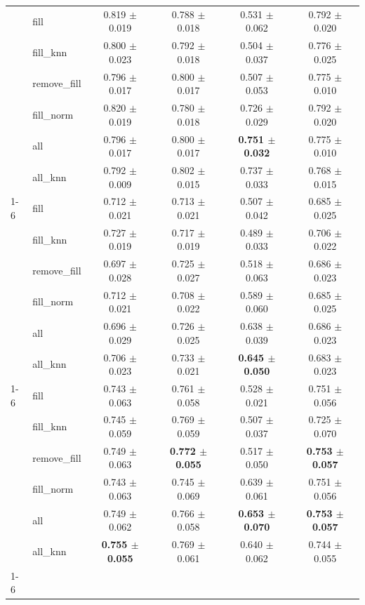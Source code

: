 \begin{table}[htbp]
\begin{tabular}{llcccc}
{{\cline{1-6}
\multirow[t]{7}{*}{30%
 & fill & 0.819 $\pm$ 0.019 & 0.788 $\pm$ 0.018 & 0.531 $\pm$ 0.062 & 0.792 $\pm$ 0.020 \\
 & fill_knn & 0.800 $\pm$ 0.023 & 0.792 $\pm$ 0.018 & 0.504 $\pm$ 0.037 & 0.776 $\pm$ 0.025 \\
 & remove_fill & 0.796 $\pm$ 0.017 & 0.800 $\pm$ 0.017 & 0.507 $\pm$ 0.053 & 0.775 $\pm$ 0.010 \\
 & fill_norm & 0.820 $\pm$ 0.019 & 0.780 $\pm$ 0.018 & 0.726 $\pm$ 0.029 & 0.792 $\pm$ 0.020 \\
 & all & 0.796 $\pm$ 0.017 & 0.800 $\pm$ 0.017 & \textbf{0.751 $\pm$ 0.032} & 0.775 $\pm$ 0.010 \\
 & all_knn & 0.792 $\pm$ 0.009 & 0.802 $\pm$ 0.015 & 0.737 $\pm$ 0.033 & 0.768 $\pm$ 0.015 \\
\cline{1-6}
\multirow[t]{7}{*}{40%
 & fill & 0.712 $\pm$ 0.021 & 0.713 $\pm$ 0.021 & 0.507 $\pm$ 0.042 & 0.685 $\pm$ 0.025 \\
 & fill_knn & 0.727 $\pm$ 0.019 & 0.717 $\pm$ 0.019 & 0.489 $\pm$ 0.033 & 0.706 $\pm$ 0.022 \\
 & remove_fill & 0.697 $\pm$ 0.028 & 0.725 $\pm$ 0.027 & 0.518 $\pm$ 0.063 & 0.686 $\pm$ 0.023 \\
 & fill_norm & 0.712 $\pm$ 0.021 & 0.708 $\pm$ 0.022 & 0.589 $\pm$ 0.060 & 0.685 $\pm$ 0.025 \\
 & all & 0.696 $\pm$ 0.029 & 0.726 $\pm$ 0.025 & 0.638 $\pm$ 0.039 & 0.686 $\pm$ 0.023 \\
 & all_knn & 0.706 $\pm$ 0.023 & 0.733 $\pm$ 0.021 & \textbf{0.645 $\pm$ 0.050} & 0.683 $\pm$ 0.023 \\
\cline{1-6}
\multirow[t]{7}{*}{50%
 & fill & 0.743 $\pm$ 0.063 & 0.761 $\pm$ 0.058 & 0.528 $\pm$ 0.021 & 0.751 $\pm$ 0.056 \\
 & fill_knn & 0.745 $\pm$ 0.059 & 0.769 $\pm$ 0.059 & 0.507 $\pm$ 0.037 & 0.725 $\pm$ 0.070 \\
 & remove_fill & 0.749 $\pm$ 0.063 & \textbf{0.772 $\pm$ 0.055} & 0.517 $\pm$ 0.050 & \textbf{0.753 $\pm$ 0.057} \\
 & fill_norm & 0.743 $\pm$ 0.063 & 0.745 $\pm$ 0.069 & 0.639 $\pm$ 0.061 & 0.751 $\pm$ 0.056 \\
 & all & 0.749 $\pm$ 0.062 & 0.766 $\pm$ 0.058 & \textbf{0.653 $\pm$ 0.070} & \textbf{0.753 $\pm$ 0.057} \\
 & all_knn & \textbf{0.755 $\pm$ 0.055} & 0.769 $\pm$ 0.061 & 0.640 $\pm$ 0.062 & 0.744 $\pm$ 0.055 \\
\cline{1-6}
\bottomrule
\end{tabular}
\end{table}
